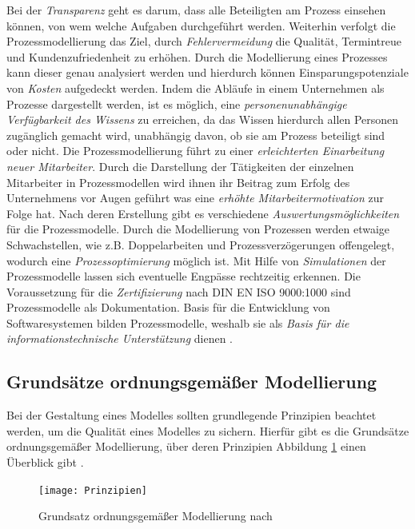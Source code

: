 Bei der \textit{Transparenz} geht es darum, dass alle Beteiligten am Prozess einsehen können, von wem welche Aufgaben durchgeführt werden. Weiterhin verfolgt die Prozessmodellierung das Ziel, durch \textit{Fehlervermeidung} die Qualität, Termintreue und Kundenzufriedenheit zu erhöhen. Durch die Modellierung eines Prozesses kann dieser genau analysiert werden und hierdurch können Einsparungspotenziale von \textit{Kosten} aufgedeckt werden. Indem die Abläufe in einem Unternehmen als Prozesse dargestellt werden, ist es möglich, eine \textit{personenunabhängige Verfügbarkeit des Wissens} zu erreichen, da das Wissen hierdurch allen Personen zugänglich gemacht wird, unabhängig davon, ob sie am Prozess beteiligt sind oder nicht. Die Prozessmodellierung führt zu einer \textit{erleichterten Einarbeitung neuer Mitarbeiter}. Durch die Darstellung der Tätigkeiten der einzelnen Mitarbeiter in Prozessmodellen wird ihnen ihr Beitrag zum Erfolg des Unternehmens vor Augen geführt was eine \textit{erhöhte Mitarbeitermotivation} zur Folge hat. Nach deren Erstellung gibt es verschiedene \textit{Auswertungsmöglichkeiten} für die Prozessmodelle. Durch die Modellierung von Prozessen werden etwaige Schwachstellen, wie z.B. Doppelarbeiten und Prozessverzögerungen offengelegt, wodurch eine \textit{Prozessoptimierung} möglich ist. Mit Hilfe von \textit{Simulationen} der Prozessmodelle lassen sich eventuelle Engpässe rechtzeitig erkennen. Die Voraussetzung für die \textit{Zertifizierung} nach DIN EN ISO 9000:1000 sind Prozessmodelle als Dokumentation. Basis für die Entwicklung von Softwaresystemen bilden Prozessmodelle, weshalb sie als \textit{Basis für die informationstechnische Unterstützung} dienen \cite{koch2011}.

\subsection{Grundsätze ordnungsgemäßer Modellierung}

Bei der Gestaltung eines Modelles sollten grundlegende Prinzipien beachtet werden, um die Qualität eines Modelles zu sichern. Hierfür gibt es die Grundsätze ordnungsgemäßer Modellierung, über deren Prinzipien Abbildung \ref{fig:Prinzipien} einen Überblick gibt  \cite{freund2007}.

\begin{figure}[htp]
\begin{center}
  \texttt{[image: Prinzipien]} %
  \caption{Grundsatz ordnungsgemäßer Modellierung nach \cite{journals95}}
  \label{fig:Prinzipien}
\end{center}
\end{figure}

